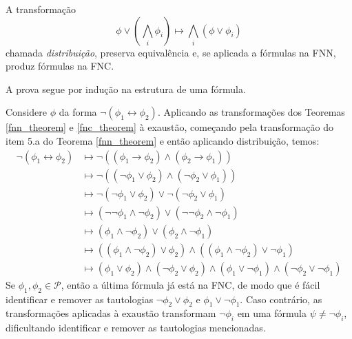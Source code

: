 \begin{theorem}
	\label{fnc_theorem}
    A transformação $$\phi \vee \left( \bigwedge_i \phi_i \right) \longmapsto \bigwedge_i \left( \phi \vee \phi_i \right)$$ chamada \emph{distribuição}, preserva equivalência e, se aplicada a fórmulas na FNN, produz fórmulas na FNC.
\end{theorem}

A prova segue por indução na estrutura de uma fórmula.

\begin{example}
    Considere $\phi$ da forma $\neg(\phi_1 \leftrightarrow \phi_2)$. Aplicando as transformações dos Teoremas \ref{fnn_theorem} e \ref{fnc_theorem} à exaustão, começando pela transformação do item 5.a do Teorema \ref{fnn_theorem} e então aplicando distribuição, temos:
    \begin{equation*}
        \begin{split}
            \neg(\phi_1 \leftrightarrow \phi_2) & \longmapsto \neg((\phi_1 \rightarrow \phi_2) \wedge (\phi_2 \rightarrow \phi_1)) \\
                 & \longmapsto \neg((\neg \phi_1 \vee \phi_2) \wedge (\neg \phi_2 \vee \phi_1)) \\
                 & \longmapsto \neg(\neg \phi_1 \vee \phi_2) \vee \neg(\neg \phi_2 \vee \phi_1) \\
                 & \longmapsto (\neg \neg \phi_1 \wedge \neg \phi_2) \vee (\neg \neg \phi_2 \wedge \neg \phi_1) \\
                 & \longmapsto (\phi_1 \wedge \neg \phi_2) \vee (\phi_2 \wedge \neg \phi_1) \\
                 & \longmapsto ((\phi_1 \wedge \neg \phi_2) \vee \phi_2) \wedge ((\phi_1 \wedge \neg \phi_2) \vee \neg \phi_1) \\
                 & \longmapsto (\phi_1 \vee \phi_2) \wedge (\neg \phi_2 \vee \phi_2) \wedge (\phi_1 \vee \neg \phi_1) \wedge (\neg \phi_2 \vee \neg \phi_1)
        \end{split}
    \end{equation*}
    Se $\phi_1,\phi_2 \in \mathcal{P}$, então a última fórmula já está na FNC, de modo que é fácil identificar e remover as tautologias $\neg \phi_2 \vee \phi_2$ e $\phi_1 \vee \neg \phi_1$. Caso contrário, as transformações aplicadas à exaustão transformam $\neg \phi_i$ em uma fórmula $\psi \neq \neg \phi_i$, dificultando identificar e remover as tautologias mencionadas.
    

\end{example}
